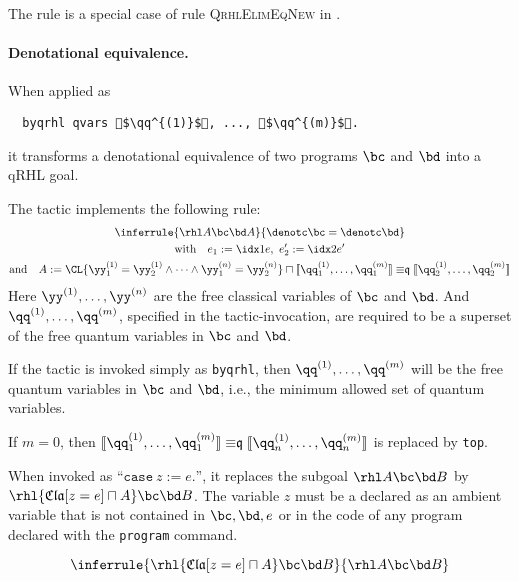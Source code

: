 \documentclass{article}
\renewcommand\ruleref[1]{rule \hbox{\textsc{#1}}}
\begin{document}
The rule is a special case of \ruleref{QrhlElimEqNew} in
\cite{local-variables}.

\paragraph{Denotational equivalence.}
When applied as
\begin{lstlisting}
  byqrhl qvars $\qq^{(1)}$, ..., $\qq^{(m)}$.
\end{lstlisting}
it transforms a denotational equivalence of two programs $\bc$ and $\bd$ into a qRHL goal.



The tactic implements the following rule:
\begin{multline*}
\inferrule{
  \pb\rhl A
  \bc\bd
  A
}
{
  \denotc\bc = \denotc\bd
}
\\
\text{with}\quad e_1 := \idx1e,\ e'_2 := \idx2e'
\\
\text{and}\quad  A := {\CL{\yy^{(1)}_1=\yy^{(1)}_2\land\dots\land\yy^{(n)}_1=\yy^{(n)}_2}\sqcap
    \llbracket \qq_1^{(1)},\dots,\qq_1^{(m)} \rrbracket
    \mathrel{\mathord\equiv\mathfrak q}
    \llbracket \qq_2^{(1)},\dots,\qq_2^{(m)} \rrbracket}
\end{multline*}
Here $\yy^{(1)},\dots,\yy^{(n)}$
are the free classical variables of $\bc$ and $\bd$.
And $\qq^{(1)},\dots,\qq^{(m)}$, specified in the tactic-invocation,
are required to be a superset of the free quantum variables in $\bc$ and $\bd$.


If the tactic is invoked simply as \texttt{byqrhl}, then $\qq^{(1)},\dots,\qq^{(m)}$ will be the free quantum variables in $\bc$ and $\bd$, i.e., the minimum allowed set of quantum variables.

If $m=0$, then $\llbracket \qq_1^{(1)},\dots,\qq_1^{(m)} \rrbracket
\mathrel{\mathord\equiv\mathfrak q} \llbracket
\qq_n^{(1)},\dots,\qq_n^{(m)} \rrbracket$ is replaced by \texttt{top}.



When invoked as ``$\mathtt{case}\ z := e\mathtt{.}$'',
it replaces the subgoal $\rhl A\bc\bd B$
by $\rhl{\mathfrak{Cla}[z=e]\sqcap A}\bc\bd B$.
The variable $z$
must be a declared as an ambient variable that is not contained in
$\bc,\bd,e$
or in the code of any program declared with the \texttt{program} command.

\[
\inferrule
{\rhl{\mathfrak{Cla}[z=e]\sqcap A}\bc\bd B}
{\rhl A\bc\bd B}
\]
\end{document}
